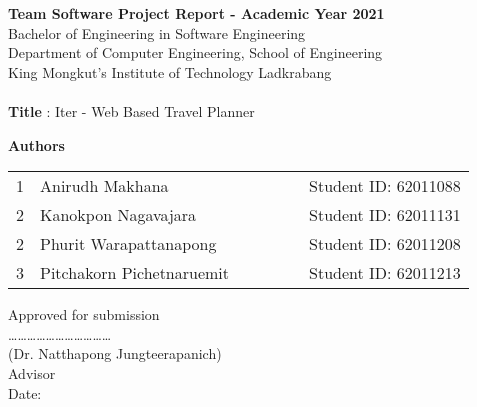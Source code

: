 \noindent\textbf{\fontsize{12}{14}Team Software Project Report - Academic Year 2021 \\}
Bachelor of Engineering in Software Engineering\\
Department of Computer Engineering, School of Engineering\\
King Mongkut's Institute of Technology Ladkrabang\\\\
\textbf{Title }: Iter - Web Based Travel Planner

\noindent\textbf{Authors}
\begin{table}[h]
\begin{tabular}{lllllll}
1 & Anirudh Makhana & & & & & Student ID: 62011088 \\
2 & Kanokpon Nagavajara & & & & & Student ID: 62011131 \\
2 & Phurit Warapattanapong & & & & & Student ID: 62011208 \\
3 & Pitchakorn Pichetnaruemit & & & & & Student ID: 62011213
\end{tabular}
\end{table}

\addvspace{12cm}

\begin{flushright}
Approved for submission \\
\ldots\ldots\ldots\ldots\ldots\ldots\ldots\ldots\ldots\ldots\ldots \\
(Dr. Natthapong Jungteerapanich) \\
Advisor \\
Date: \date{\today}
\end{flushright}

